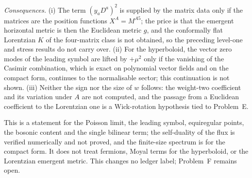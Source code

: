 \emph{Consequences.} (i) The term \((y_aD^a)^2\) is supplied by the matrix data only if the matrices are the position functions \(X^A=M^{A5}\); the price is that the emergent horizontal metric is then the Euclidean metric \(g\), and the conformally flat Lorentzian \(K\) of the four-matrix class is not obtained, so the preceding level-one and stress results do not carry over. (ii) For the hyperboloid, the vector zero modes of the leading symbol are lifted by \(+\mu^2\) only if the vanishing of the Casimir combination, which is exact on polynomial vector fields and on the compact form, continues to the normalisable sector; this continuation is not shown. (iii) Neither the sign nor the size of \(w\) follows: the weight-two coefficient and its variation under \(A\) are not computed, and the passage from a Euclidean coefficient to the Lorentzian one is a Wick-rotation hypothesis tied to Problem~E.

This is a statement for the Poisson limit, the leading symbol, equiregular points, the bosonic content and the single bilinear term; the self-duality of the flux is verified numerically and not proved, and the finite-size spectrum is for the compact form. It does not treat fermions, Moyal terms for the hyperboloid, or the Lorentzian emergent metric. This changes no ledger label; Problem~F remains open.
